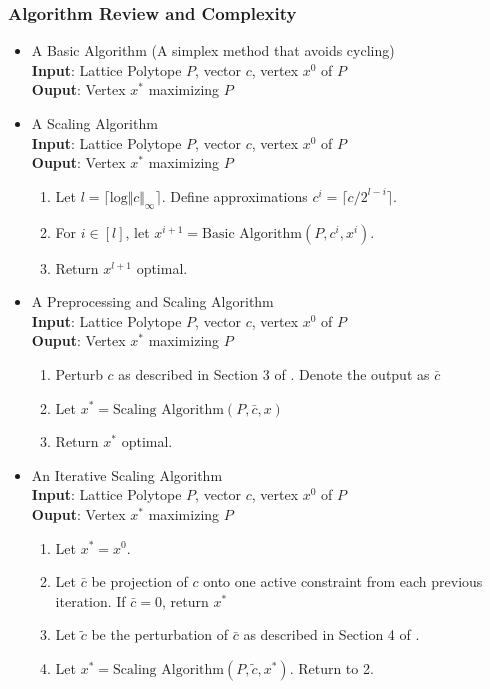 \documentclass[11pt]{article}
\begin{document}
\subsubsection{Algorithm Review and Complexity}
\begin{itemize}
	\item A Basic Algorithm (A simplex method that avoids cycling) \\
	\textbf{Input}: Lattice Polytope $P$, vector $c$, vertex $x^0$ of $P$ \\
	\textbf{Ouput}: Vertex $x^*$ maximizing $P$ 

	\item A Scaling Algorithm \\
	\textbf{Input}: Lattice Polytope $P$, vector $c$, vertex $x^0$ of $P$ \\
	\textbf{Ouput}: Vertex $x^*$ maximizing $P$
	\begin{enumerate}
		\item Let $l = \lceil \text{log}\Vert c \Vert_\infty \rceil$. Define approximations $c^i = \lceil c/2^{l - i} \rceil$.
		\item For $i \in [l]$, let $x^{i+1} = \text{Basic Algorithm}(P, c^i, x^i)$.
		\item Return $x^{l+1}$ optimal.
	\end{enumerate}
	\item A Preprocessing and Scaling Algorithm \\
	\textbf{Input}: Lattice Polytope $P$, vector $c$, vertex $x^0$ of $P$ \\
	\textbf{Ouput}: Vertex $x^*$ maximizing $P$
	\begin{enumerate}
		\item Perturb $c$ as described in Section 3 of \cite{preprocess}. Denote the output as $\bar{c}$
		\item Let $x^* = \text{Scaling Algorithm}(P, \bar{c}, x)$
		\item Return $x^*$ optimal.
	\end{enumerate}
	\item An Iterative Scaling Algorithm \\
	\textbf{Input}: Lattice Polytope $P$, vector $c$, vertex $x^0$ of $P$ \\
	\textbf{Ouput}: Vertex $x^*$ maximizing $P$
	\begin{enumerate}
		\item Let $x^* = x^0$.
		\item Let $\bar{c}$ be projection of $c$ onto one active constraint from each previous iteration. If $\bar{c} = 0$, return $x^*$
		\item Let $\tilde{c}$ be the perturbation of $\bar{c}$ as described in Section 4 of \cite{pia}.
		\item Let $x^* = \text{Scaling Algorithm}(P, \tilde{c}, x^*)$. Return to 2.
	\end{enumerate}
\end{itemize}
\end{document}
